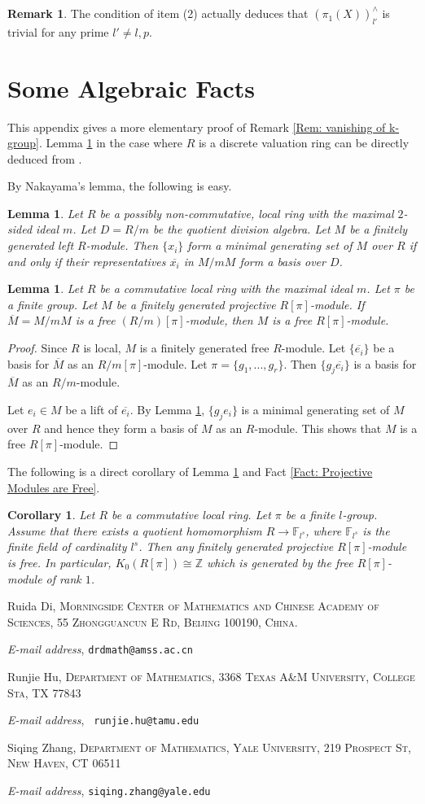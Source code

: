 \documentclass[11pt]{amsart}
\makeatletter
\newtheorem{lemma}[theorem]{Lemma}
\newtheorem{corollary}[theorem]{Corollary}
\theoremstyle{definition}
\newtheorem{remark}[theorem]{Remark}
\numberwithin{equation}{section}
\numberwithin{equation}{section}
\newcommand\ZZ{\mathbb{Z}}
\newcommand\FF{\mathbb{F}}
\DeclareMathOperator{\et}{\acute{e}t}
\newcommand{\Addresses}{{%
  \bigskip
  \footnotesize
  Ruida Di, \textsc{Morningside Center of Mathematics and Chinese Academy of Sciences, 55 Zhongguancun E Rd, Beijing 100190, China.}\par\nopagebreak
  \textit{E-mail address}, \texttt{drdmath@amss.ac.cn}


  Runjie Hu, \textsc{Department of Mathematics, 3368 Texas A\&M University, College Sta, TX 77843}\par\nopagebreak
  \textit{E-mail address}, \texttt{ runjie.hu@tamu.edu}

  Siqing Zhang, \textsc{Department of Mathematics, Yale University, 219 Prospect St, New Haven, CT 06511}\par\nopagebreak
  \textit{E-mail address}, \texttt{siqing.zhang@yale.edu}
}}
\makeatother
\begin{document}
\begin{remark}
The condition of item (2) actually deduces that $(\pi^{\et}_1(X))^{\wedge}_{l'}$ is trivial for any prime $l'\neq l,p$. 
\end{remark}

\appendix

\section{Some Algebraic Facts}

This appendix gives a more elementary proof of Remark \ref{Rem: vanishing of k-group}.
Lemma \ref{Lemma: appendix 2} in the case where $R$ is a discrete valuation ring can be directly deduced from \cite[Theorem 77.2]{curtis1966representation}.

By Nakayama's lemma, the following is easy.

\begin{lemma}\label{Lemma: Nakayama}
Let $R$ be a possibly non-commutative, local ring with the maximal $2$-sided ideal $m$. Let $D=R/m$ be the quotient division algebra. Let $M$ be a finitely generated left $R$-module. Then $\{x_i\}$ form a minimal generating set of $M$ over $R$ if and only if their representatives $\overline{x_i}$ in $M/mM$ form a basis over $D$.
\end{lemma}

\begin{lemma}\label{Lemma: appendix 2}
Let $R$ be a commutative local ring with the maximal ideal $m$. Let $\pi$ be a finite group. Let $M$ be a finitely generated projective $R[\pi]$-module. If  $\overline{M}=M/mM$ is a free $(R/m)[\pi]$-module, then $M$ is a free $R[\pi]$-module.
\end{lemma}

\begin{proof}
Since $R$ is local, $M$ is a finitely generated free $R$-module. Let $\{\overline{e_i}\}$ be a basis for $\overline{M}$ as an $R/m[\pi]$-module. Let $\pi=\{g_1,...,g_r\}$. Then $\{g_j\overline{e_i}\}$ is a basis for $\overline{M}$ as an $R/m$-module. 

Let $e_i\in M$ be a lift of $\overline{e_i}$. By Lemma \ref{Lemma: Nakayama}, $\{g_je_i\}$ is a minimal generating set of $M$ over $R$ and hence they form a basis of $M$ as an $R$-module. This shows that $M$ is a free $R[\pi]$-module.
\end{proof}

The following is a direct corollary of Lemma \ref{Lemma: appendix 2} and Fact \ref{Fact: Projective Modules are Free}.

\begin{corollary}\label{Cor:: freeness of modules}
Let $R$ be a commutative local ring. Let $\pi$ be a finite $l$-group. Assume that there exists a quotient homomorphism $R\rightarrow \FF_{l^s}$, where $\FF_{l^s}$ is the finite field of cardinality $l^s$. Then any finitely generated projective $R[\pi]$-module is free. In particular, $K_0(R[\pi])\cong \ZZ$ which is generated by the free $R[\pi]$-module of rank $1$.
\end{corollary}




\Addresses
\end{document}
